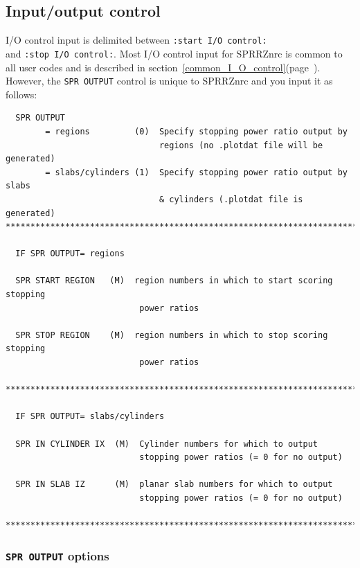 \documentclass[12pt,twoside]{article}  %
\newcommand{\lpage}[1]{(page~\pageref{#1})}
\begin{document}
\subsection{Input/output control}

I/O control input is delimited between \verb+:start I/O control:+\\
and \verb+:stop I/O control:+.  Most I/O control input
for SPRRZnrc is common to all user codes and is described in
section~\ref{common_I_O_control}\lpage{common_I_O_control}.  However,
the {\tt SPR OUTPUT} control is unique to SPRRZnrc and you input it
as follows:
\begin{verbatim}
  SPR OUTPUT
        = regions         (0)  Specify stopping power ratio output by
                               regions (no .plotdat file will be generated)
        = slabs/cylinders (1)  Specify stopping power ratio output by slabs
                               & cylinders (.plotdat file is generated)
***************************************************************************

  IF SPR OUTPUT= regions

  SPR START REGION   (M)  region numbers in which to start scoring stopping
                           power ratios

  SPR STOP REGION    (M)  region numbers in which to stop scoring stopping
                           power ratios

***************************************************************************

  IF SPR OUTPUT= slabs/cylinders

  SPR IN CYLINDER IX  (M)  Cylinder numbers for which to output
                           stopping power ratios (= 0 for no output)

  SPR IN SLAB IZ      (M)  planar slab numbers for which to output
                           stopping power ratios (= 0 for no output)

**************************************************************************
\end{verbatim}

\subsubsection{{\tt SPR OUTPUT} options}
\end{document}
